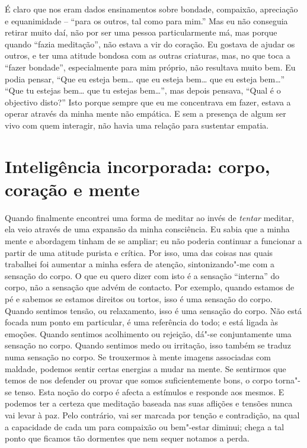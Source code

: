 É claro que nos eram dados ensinamentos sobre bondade, compaixão,
apreciação e equanimidade -- “para os outros, tal como para mim.” Mas eu
não conseguia retirar muito daí, não por ser uma pessoa particularmente
má, mas porque quando “fazia meditação”, não estava a vir do coração. Eu
gostava de ajudar os outros, e ter uma atitude bondosa com as outras
criaturas, mas, no que toca a “fazer bondade”, especialmente para mim
próprio, não resultava muito bem. Eu podia pensar, “Que eu esteja bem\ldots{}
que eu esteja bem\ldots{} que eu esteja bem\ldots{}” “Que tu estejas bem\ldots{} que tu
estejas bem\ldots{}”, mas depois pensava, “Qual é o objectivo disto?” Isto
porque sempre que eu me concentrava em fazer, estava a operar através da
minha mente não empática. E sem a presença de algum ser vivo com quem
interagir, não havia uma relação para sustentar empatia.

\section{Inteligência incorporada: corpo, coração e mente}

Quando finalmente encontrei uma forma de meditar ao invés de
\emph{tentar} meditar, ela veio através de uma expansão da minha
consciência. Eu sabia que a minha mente e abordagem tinham de se
ampliar; eu não poderia continuar a funcionar a partir de uma atitude
purista e crítica. Por isso, uma das coisas nas quais trabalhei foi
aumentar a minha esfera de atenção, sintonizando"-me com a sensação do
corpo. O que eu quero dizer com isto é a sensação “interna” do corpo,
não a sensação que advém de contacto. Por exemplo, quando estamos de pé
e sabemos se estamos direitos ou tortos, isso é uma sensação do corpo.
Quando sentimos tensão, ou relaxamento, isso é uma sensação do corpo.
Não está focada num ponto em particular, é uma referência do todo; e
está ligada às emoções. Quando sentimos acolhimento ou rejeição, dá"-se
conjuntamente uma sensação no corpo. Quando sentimos medo ou irritação,
isso também se traduz numa sensação no corpo. Se trouxermos à mente
imagens associadas com maldade, podemos sentir certas energias a mudar
na mente. Se sentirmos que temos de nos defender ou provar que somos
suficientemente bons, o corpo torna"-se tenso. Esta noção do corpo é
afecta a estímulos e responde aos mesmos. E podemos ter a certeza que
meditação baseada nas suas aflições e tensões nunca vai levar à paz.
Pelo contrário, vai ser marcada por tenção e contradição, na qual a
capacidade de cada um para compaixão ou bem"-estar diminui; chega a tal
ponto que ficamos tão dormentes que nem sequer notamos a perda.

